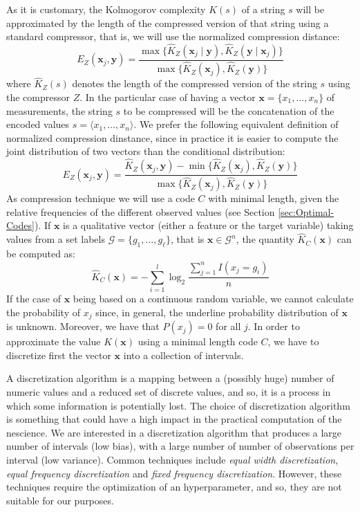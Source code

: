 As it is customary, the Kolmogorov complexity $K(s)$ of a string $s$ will be approximated by the length of the compressed version of that string using a standard compressor, that is, we will use the normalized compression distance:
\[
E_Z(\mathbf{x}_j, \mathbf{y}) = \frac{\max\{ \hat{K}_Z(\mathbf{x}_j \mid \mathbf{y}), \hat{K}_Z(\mathbf{y} \mid \mathbf{x}_j) \}}{\max \{ \hat{K}_Z(\mathbf{x}_j), \hat{K}_Z(\mathbf{y}) \} }
\]
where $\hat{K}_Z(s)$ denotes the length of the compressed version of the string $s$ using the compressor $Z$. In the particular case of having a vector $\mathbf{x} = \{ x_1, \ldots, x_n \}$ of measurements, the string $s$ to be compressed will be the concatenation of the encoded values $s = \langle x_1, \ldots, x_n \rangle$. We prefer the following equivalent definition of normalized compression dinstance, since in practice it is easier to compute the joint distribution of two vectors than the conditional distribution:
\[
E_Z(\mathbf{x}_j, \mathbf{y}) = \frac{ \hat{K}_Z(\mathbf{x}_j, \mathbf{y}) - \min\{ \hat{K}_Z(\mathbf{x}_j), \hat{K}_Z(\mathbf{y}) \} } { \max\{ \hat{K}_Z(\mathbf{x}_j), \hat{K}_Z(\mathbf{y}) \} }
\]
As compression technique we will use a code $C$ with minimal length, given the relative frequencies of the different observed values (see Section \ref{sec:Optimal-Codes}). If $\mathbf{x}$ is a qualitative vector (either a feature or the target variable) taking values from a set labels $\mathcal{G} = \{g_1, \ldots, g_\ell\}$, that is $\mathbf{x} \in \mathcal{G}^n$, the quantity $\hat{K}_C(\mathbf{x})$ can be computed as:
\[
\hat{K}_C(\mathbf{x}) = - \sum_{i=1}^l \log_2{ \frac{ \sum_{j=1}^n I(x_j = g_i)} {n} } 
\]
If the case of $\mathbf{x}$ being based on a continuous random variable, we cannot calculate the probability of $x_j$ since, in general, the underline probability distribution of $\mathbf{x}$ is unknown. Moreover, we have that $P(x_j)=0$ for all $j$. In order to approximate the value $K(\mathbf{x})$ using a minimal length code $C$, we have to discretize first the vector $\mathbf{x}$ into a collection of intervals.

A discretization algorithm is a mapping between a (possibly huge) number of numeric values and a reduced set of discrete values, and so, it is a process in which some information is potentially lost. The choice of discretization algorithm is something that could have a high impact in the practical computation of the nescience. We are interested in a discretization algorithm that produces a large number of intervals (low bias), with a large number of number of observations per interval (low variance). Common techniques include \emph{equal width discretization}, \emph{equal frequency discretization} and \emph{fixed frequency discretization}. However, these techniques require the optimization of an hyperparameter, and so, they are not suitable for our purposes.

